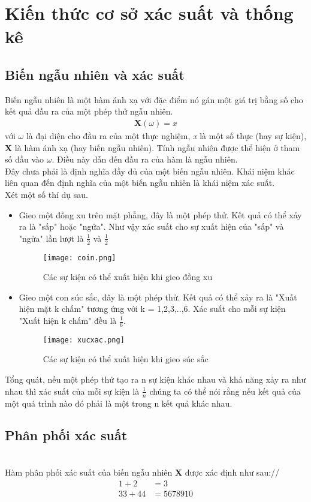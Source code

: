 \chapter{Kiến thức cơ sở xác suất và thống kê}\label{ch:1}
\section{Biến ngẫu nhiên và xác suất}\label{sec:1.1}
Biến ngẫu nhiên là một hàm ánh xạ với đặc điểm nó gán một giá trị bằng số cho kết quả đầu ra của một phép thử ngẫu nhiên.
\begin{align}
    \textbf{X}(\omega)=\textit{x}
\end{align}
với $\omega$ là đại diện cho đầu ra của một thực nghiệm, \textit{x} là một số thực (hay sự kiện), \textbf{X} là hàm ánh xạ (hay biến ngẫu nhiên).  
Tính ngẫu nhiên được thể hiện ở tham số đầu vào $\omega$. Điều này dẫn đến đầu ra của hàm là ngẫu nhiên.\\
Đây chưa phải là định nghĩa đầy đủ của một biến ngẫu nhiên. Khái niệm khác liên quan đến định nghĩa của một biến ngẫu nhiên là khái niệm xác suất. \\
Xét một số thí dụ sau.
\begin{itemize}
    \item Gieo một đồng xu trên mặt phẳng, đây là một phép thử. Kết quả có thể xảy ra là "sấp" hoặc "ngửa". Như vậy xác suất cho sự xuất hiện của "sấp" và "ngửa" lần lượt là 
	$ \frac{1}{2} $ và $ \frac{1}{2} $
	\begin{figure}[H]
		\centering
		\texttt{[image: coin.png]}
		\caption{Các sự kiện có thể xuất hiện khi gieo đồng xu}
		\label{fig:web}
	   \end{figure}
    \item Gieo một con súc sắc, đây là một phép thử. Kết quả có thể xảy ra là "Xuất hiện mặt k chấm" tương ứng với k = 1,2,3,..,6. Xác suất cho mỗi sự kiện "Xuất hiện k chấm" đều là $ \frac{1}{6} $.
    \begin{figure}[H]
		\centering
		\texttt{[image: xucxac.png]}
		\caption{Các sự kiện có thể xuất hiện khi gieo súc sắc}
		\label{fig:web}
	   \end{figure}
\end{itemize}
Tổng quát, nếu một phép thử tạo ra n sự kiện khác nhau và khả năng xảy ra như nhau thì xác suất của mỗi sự kiện là $ \frac{1}{n} $
chúng ta có thể nói rằng nếu kết quả của một quá trình nào đó phải là một trong n kết quả khác nhau. 
\par
\section{Phân phối xác suất}\label{sec:1.2}\\
Hàm phân phối xác suất của biến ngẫu nhiên \textbf{X} được xác định như sau://
\begin{align}
	1+2&=3\\
	33+44&=5678910 \label{ct1}
	\end{align}

